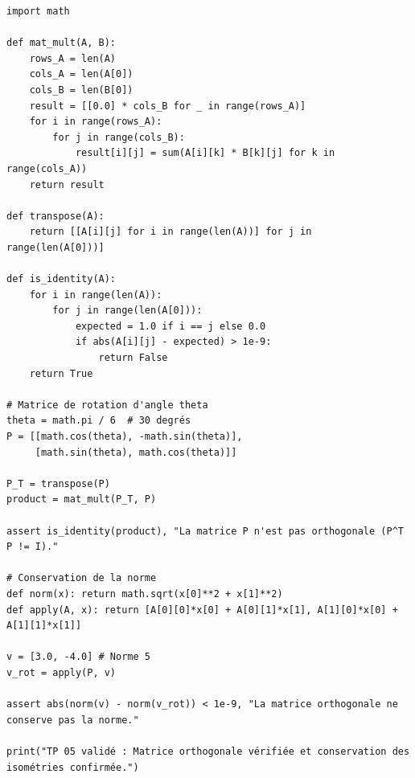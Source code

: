 \documentclass[11pt,a4paper]{article}
\begin{document}
\begin{lstlisting}
import math

def mat_mult(A, B):
    rows_A = len(A)
    cols_A = len(A[0])
    cols_B = len(B[0])
    result = [[0.0] * cols_B for _ in range(rows_A)]
    for i in range(rows_A):
        for j in range(cols_B):
            result[i][j] = sum(A[i][k] * B[k][j] for k in range(cols_A))
    return result

def transpose(A):
    return [[A[i][j] for i in range(len(A))] for j in range(len(A[0]))]

def is_identity(A):
    for i in range(len(A)):
        for j in range(len(A[0])):
            expected = 1.0 if i == j else 0.0
            if abs(A[i][j] - expected) > 1e-9:
                return False
    return True

# Matrice de rotation d'angle theta
theta = math.pi / 6  # 30 degrés
P = [[math.cos(theta), -math.sin(theta)],
     [math.sin(theta), math.cos(theta)]]

P_T = transpose(P)
product = mat_mult(P_T, P)

assert is_identity(product), "La matrice P n'est pas orthogonale (P^T P != I)."

# Conservation de la norme
def norm(x): return math.sqrt(x[0]**2 + x[1]**2)
def apply(A, x): return [A[0][0]*x[0] + A[0][1]*x[1], A[1][0]*x[0] + A[1][1]*x[1]]

v = [3.0, -4.0] # Norme 5
v_rot = apply(P, v)

assert abs(norm(v) - norm(v_rot)) < 1e-9, "La matrice orthogonale ne conserve pas la norme."

print("TP 05 validé : Matrice orthogonale vérifiée et conservation des isométries confirmée.")
\end{lstlisting}
\end{document}
